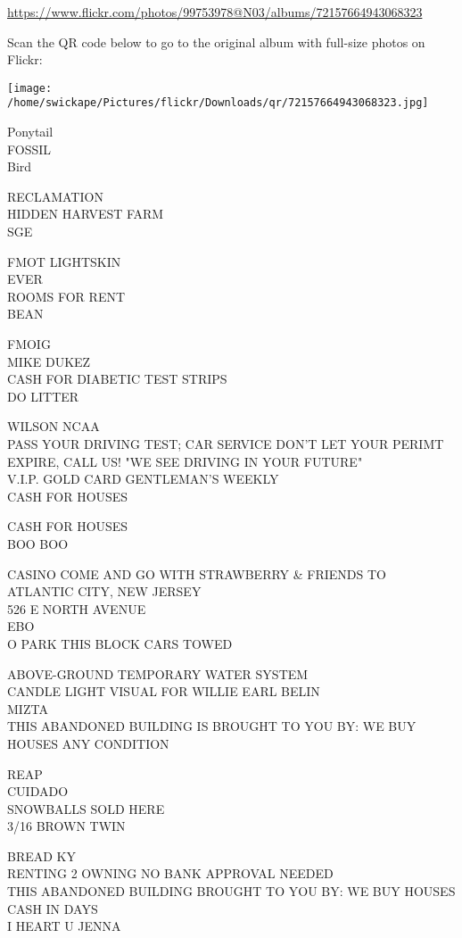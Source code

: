 \documentclass[10pt,letterpaper]{article}
\begin{document}
\url{https://www.flickr.com/photos/99753978@N03/albums/72157664943068323}

Scan the QR code below to go to the original album with full-size photos on Flickr:

\texttt{[image: /home/swickape/Pictures/flickr/Downloads/qr/72157664943068323.jpg]}


Ponytail\\
FOSSIL\\
Bird

RECLAMATION\\
HIDDEN HARVEST FARM\\
SGE

FMOT LIGHTSKIN\\
EVER\\
ROOMS FOR RENT\\
BEAN

FMOIG\\
MIKE DUKEZ\\
CASH FOR DIABETIC TEST STRIPS\\
DO LITTER

WILSON NCAA\\
PASS YOUR DRIVING TEST; CAR SERVICE DON'T LET YOUR PERIMT EXPIRE, CALL US!  "WE SEE DRIVING IN YOUR FUTURE"\\
V.I.P. GOLD CARD GENTLEMAN'S WEEKLY\\
CASH FOR HOUSES

CASH FOR HOUSES\\
BOO BOO

CASINO COME AND GO WITH STRAWBERRY \& FRIENDS TO ATLANTIC CITY, NEW JERSEY\\
526 E NORTH AVENUE\\
EBO\\
O PARK THIS BLOCK CARS TOWED

ABOVE{-}GROUND TEMPORARY WATER SYSTEM\\
CANDLE LIGHT VISUAL FOR WILLIE EARL BELIN\\
MIZTA\\
THIS ABANDONED BUILDING IS BROUGHT TO YOU BY: WE BUY HOUSES ANY CONDITION

REAP\\
CUIDADO\\
SNOWBALLS SOLD HERE\\
3/16 BROWN TWIN

BREAD KY\\
RENTING 2 OWNING NO BANK APPROVAL NEEDED\\
THIS ABANDONED BUILDING BROUGHT TO YOU BY: WE BUY HOUSES CASH IN DAYS\\
I HEART U JENNA
\end{document}
